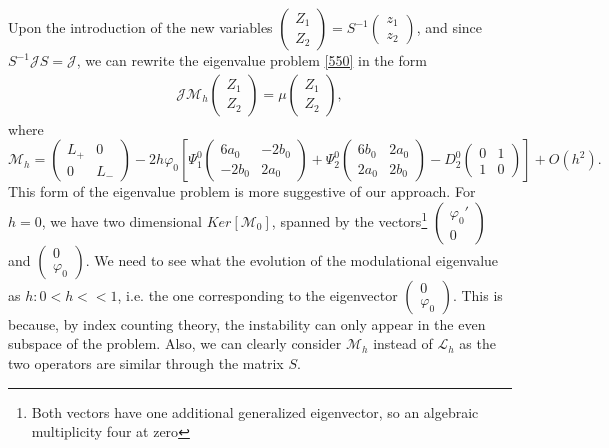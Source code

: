 \documentclass[12pt]{amsart}
\theoremstyle{definition}
\theoremstyle{remark}
\numberwithin{equation}{section}
\renewcommand{\(}{\left(}
\renewcommand{\)}{\right)}
\renewcommand{\[}{\left[}
\renewcommand{\]}{\right]}
\newcommand{\cl}{{\mathcal L}}
\newcommand{\vp}{\varphi}
\newcommand{\cm}{\mathcal M}
\newcommand{\cj}{{\mathcal J}}
\begin{document}
 Upon the introduction of the new variables $\left(\begin{array}{c}
 Z_1 \\ Z_2
 \end{array}\right)= S^{-1}  \left(\begin{array}{c}
 z_1 \\ z_2
 \end{array}\right)$, and since $S^{-1} \cj S=\cj$, we can rewrite the eigenvalue problem \eqref{550} in the form
 \begin{eqnarray}
 \label{570}
 \cj \cm_h \left(\begin{array}{c}
 Z_1 \\ Z_2
 \end{array}\right) =\mu \left(\begin{array}{c}
 Z_1 \\ Z_2
 \end{array}\right),
 \end{eqnarray}
 where
 $$
 \cm_h=    \left(\begin{array}{cc}
 L_+ 	  &   0 \\
 0    &  L_-
 \end{array}
 \right) - 2 h \vp_0 [\Psi_1^0  \left(\begin{array}{cc}
 6a_0	& -2b_0 \\
 -2b_0  & 2 a_0
 \end{array}
 \right) +\Psi_2^0   \left(\begin{array}{cc}
 6 b_0 &  2 a_0   \\
 2a_0   & 2b_0
 \end{array}
 \right)-D_2^0\left( \begin{array}{cc}
 0 & 1 \\
 1 & 0
 \end{array} \right)]+O(h^2).
 $$
 This form of the eigenvalue problem is more suggestive of our approach. For $h=0$, we have two dimensional $Ker[\cm_0]$, spanned by the vectors\footnote{Both vectors have one additional generalized eigenvector, so an algebraic multiplicity four at zero}   $\left(\begin{array}{c}
 \vp_0'\\ 0
 \end{array}\right)$ and $\left(\begin{array}{c}
 0 \\ \vp_0
 \end{array}\right)$.
We need to see what the evolution of the  modulational eigenvalue as $h: 0<h<<1$, i.e. the one corresponding to the eigenvector $\left(\begin{array}{c}
0 \\ \vp_0
\end{array}\right)$. This is because, by index counting theory, the instability can only appear in the even subspace of the problem. Also, we can clearly  consider $\cm_h$ instead of $\cl_h$ as the two operators are similar through the matrix $S$.
\end{document}
